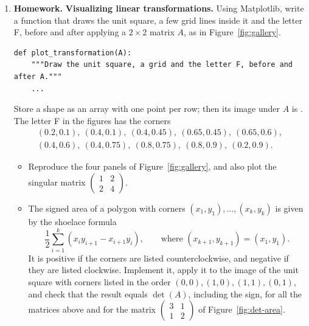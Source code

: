 \documentclass[11pt]{article}
\newcommand{\homework}{\textcolor{red!70!black}{\textbf{Homework.}}}
\newcommand{\py}[1]{\texttt{\detokenize{#1}}}
\theoremstyle{definition}
\theoremstyle{plain}
\theoremstyle{remark}
\begin{document}
\begin{enumerate}[label=\textbf{P\arabic*.}, leftmargin=*]
    \item \homework{} \textbf{Visualizing linear transformations.} Using Matplotlib, write a function that draws the unit square, a few grid lines inside it and the letter F, before and after applying a $2 \times 2$ matrix $A$, as in Figure~\ref{fig:gallery}.
\begin{lstlisting}
def plot_transformation(A):
    """Draw the unit square, a grid and the letter F, before and after A."""
    ...
\end{lstlisting}
    Store a shape as an array \py{P} with one point per row; then its image under $A$ is \py{P @ A.T}. The letter F in the figures has the corners
    \begin{gather*}
        (0.2, 0.1),\ (0.4, 0.1),\ (0.4, 0.45),\ (0.65, 0.45),\ (0.65, 0.6), \\
        (0.4, 0.6),\ (0.4, 0.75),\ (0.8, 0.75),\ (0.8, 0.9),\ (0.2, 0.9).
    \end{gather*}
    \begin{itemize}
        \item Reproduce the four panels of Figure~\ref{fig:gallery}, and also plot the singular matrix $\begin{pmatrix} 1 & 2 \\ 2 & 4 \end{pmatrix}$.
        \item The signed area of a polygon with corners $(x_1, y_1), \ldots, (x_k, y_k)$ is given by the shoelace formula
        \[\frac{1}{2} \sum_{i=1}^k (x_i y_{i+1} - x_{i+1} y_i), \qquad \text{where } (x_{k+1}, y_{k+1}) = (x_1, y_1).\]
        It is positive if the corners are listed counterclockwise, and negative if they are listed clockwise. Implement it, apply it to the image of the unit square with corners listed in the order $(0, 0), (1, 0), (1, 1), (0, 1)$, and check that the result equals $\det(A)$, including the sign, for all the matrices above and for the matrix $\begin{pmatrix} 3 & 1 \\ 1 & 2 \end{pmatrix}$ of Figure~\ref{fig:det-area}.
    \end{itemize}


\end{enumerate}
\end{document}
